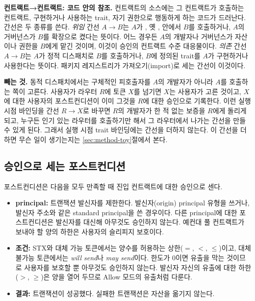 \textbf{컨트랙트→컨트랙트: 코드 안의 참조.} 컨트랙트의 소스에는 그 컨트랙트가 호출하는 컨트랙트, 구현하거나 사용하는 trait, 자기 권한으로 행동하게 하는 코드가 드러난다. 간선은 두 종류를 쓴다. \emph{위임} 간선 $A\to B$는 $A$가 , 옛 ,  안에서 $B$를 호출하거나, $A$의 거버넌스가 $B$를 확장으로 켰다는 뜻이다. 어느 경우든 $A$의 개발자나 거버넌스가 자산이나 권한을 $B$에게 맡긴 것이며, 이것이 승인의 컨트랙트 수준 대응물이다. \emph{의존} 간선 $A\to B$는 $A$가 정적 디스패치로 $B$를 호출하거나, $B$에 정의된 trait를 $A$가 구현하거나 사용한다는 뜻이다. 패키지 레지스트리가 가져오기(import)로 세는 간선이 이것이다.

\textbf{빼는 것.} 동적 디스패치에서는 구체적인 피호출자를 $A$의 개발자가 아니라 $A$를 호출하는 쪽이 고른다. 사용자가 라우터 $R$에 토큰 $X$를 넘기면 $X$는 사용자가 고른 것이고, $X$에 대한 사용자의 포스트컨디션이 이미 그것을 $R$에 대한 승인으로 기록한다. 이런 실행 시점 바인딩을 간선 $R\to X$로 바꾸면 $R$의 개발자가 한 적 없는 보증을 $R$에게 돌리게 되고, 누구든 인기 있는 라우터를 호출하기만 해서 그 라우터에서 나가는 간선을 만들 수 있게 된다. 그래서 실행 시점 trait 바인딩에는 간선을 더하지 않는다. 이 간선을 더하면 무슨 일이 생기는지는 \ref{sec:method-toy}절에서 본다.

\subsection{승인으로 세는 포스트컨디션}
\label{sec:mapping-rules}

포스트컨디션은 다음을 모두 만족할 때 진입 컨트랙트에 대한 승인으로 센다.

\begin{itemize}
\item \textbf{principal:} 트랜잭션 발신자를 제한한다. 발신자(origin) principal 유형을 쓰거나, 발신자 주소와 같은 standard principal을 쓴 경우이다. 다른 principal에 대한 포스트컨디션은 발신자를 대신해 아무것도 승인하지 않는다. 예컨대 풀 컨트랙트가 보내야 할 양의 하한은 사용자의 슬리피지 보호이다.
\item \textbf{조건:} STX와 대체 가능 토큰에서는 양수를 허용하는 상한($=$, $<$, $\leq$)이고, 대체 불가능 토큰에서는 \emph{will send}나 \emph{may send}이다. 한도가 0이면 유출을 막는 것이므로 사용자를 보호할 뿐 아무것도 승인하지 않는다. 발신자 자신의 유출에 대한 하한($>$, $\geq$)은 양을 열어 두므로 Allow 모드의 유출처럼 다룬다.
\item \textbf{결과:} 트랜잭션이 성공했다. 실패한 트랜잭션은 자산을 옮기지 않는다.
\end{itemize}

